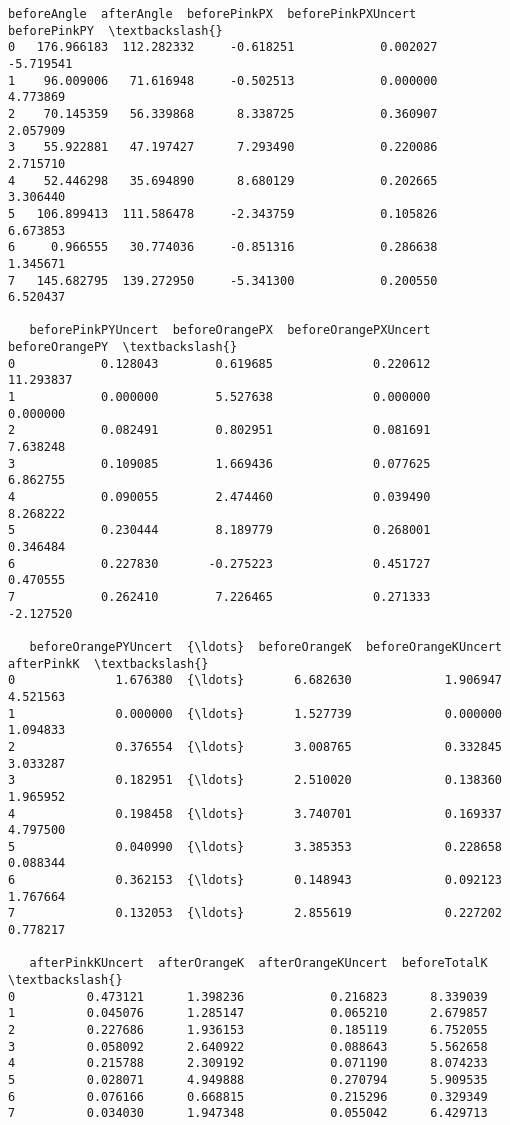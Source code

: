 \documentclass[11pt]{article}
\makeatletter
\newcommand{\boxspacing}{\kern\kvtcb@left@rule\kern\kvtcb@boxsep}
\newcommand{\prompt}[4]{
        {\ttfamily\llap{{\color{#2}[#3]:\hspace{3pt}#4}}\vspace{-\baselineskip}}
    }
\makeatother
\begin{document}
            \begin{tcolorbox}[breakable, size=fbox, boxrule=.5pt, pad at break*=1mm, opacityfill=0]
\prompt{Out}{outcolor}{27}{\boxspacing}
\begin{Verbatim}[commandchars=\\\{\}]
   beforeAngle  afterAngle  beforePinkPX  beforePinkPXUncert  beforePinkPY  \textbackslash{}
0   176.966183  112.282332     -0.618251            0.002027     -5.719541
1    96.009006   71.616948     -0.502513            0.000000      4.773869
2    70.145359   56.339868      8.338725            0.360907      2.057909
3    55.922881   47.197427      7.293490            0.220086      2.715710
4    52.446298   35.694890      8.680129            0.202665      3.306440
5   106.899413  111.586478     -2.343759            0.105826      6.673853
6     0.966555   30.774036     -0.851316            0.286638      1.345671
7   145.682795  139.272950     -5.341300            0.200550      6.520437

   beforePinkPYUncert  beforeOrangePX  beforeOrangePXUncert  beforeOrangePY  \textbackslash{}
0            0.128043        0.619685              0.220612       11.293837
1            0.000000        5.527638              0.000000        0.000000
2            0.082491        0.802951              0.081691        7.638248
3            0.109085        1.669436              0.077625        6.862755
4            0.090055        2.474460              0.039490        8.268222
5            0.230444        8.189779              0.268001        0.346484
6            0.227830       -0.275223              0.451727        0.470555
7            0.262410        7.226465              0.271333       -2.127520

   beforeOrangePYUncert  {\ldots}  beforeOrangeK  beforeOrangeKUncert  afterPinkK  \textbackslash{}
0              1.676380  {\ldots}       6.682630             1.906947    4.521563
1              0.000000  {\ldots}       1.527739             0.000000    1.094833
2              0.376554  {\ldots}       3.008765             0.332845    3.033287
3              0.182951  {\ldots}       2.510020             0.138360    1.965952
4              0.198458  {\ldots}       3.740701             0.169337    4.797500
5              0.040990  {\ldots}       3.385353             0.228658    0.088344
6              0.362153  {\ldots}       0.148943             0.092123    1.767664
7              0.132053  {\ldots}       2.855619             0.227202    0.778217

   afterPinkKUncert  afterOrangeK  afterOrangeKUncert  beforeTotalK  \textbackslash{}
0          0.473121      1.398236            0.216823      8.339039
1          0.045076      1.285147            0.065210      2.679857
2          0.227686      1.936153            0.185119      6.752055
3          0.058092      2.640922            0.088643      5.562658
4          0.215788      2.309192            0.071190      8.074233
5          0.028071      4.949888            0.270794      5.909535
6          0.076166      0.668815            0.215296      0.329349
7          0.034030      1.947348            0.055042      6.429713


\end{Verbatim}
\end{tcolorbox}
\end{document}
